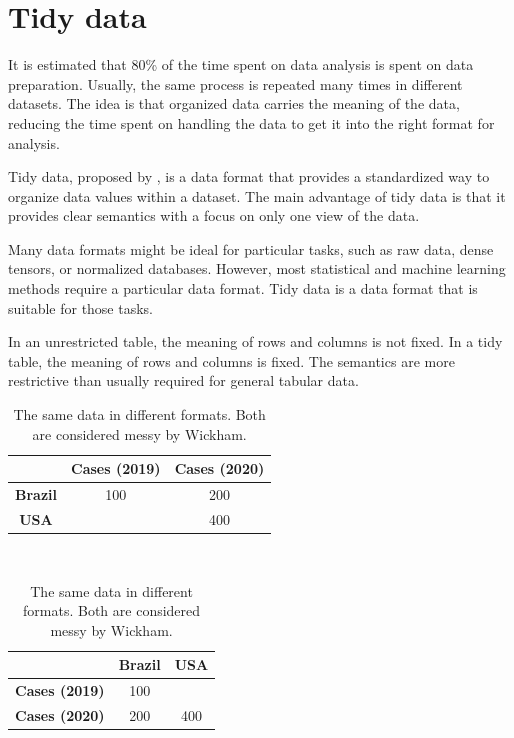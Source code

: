 \section{Tidy data}

It is estimated that 80\% of the time spent on data analysis is spent on data preparation.
Usually, the same process is repeated many times in different datasets. The idea is that
organized data carries the meaning of the data, reducing the time spent on handling
the data to get it into the right format for analysis.

Tidy data, proposed by \textcite{Wickham2014},
is a data format that provides a standardized way to organize data values within
a dataset.  The main advantage of tidy data is that it provides clear semantics with a focus
on only one view of the data.

Many data formats might be ideal for particular tasks, such as raw data, dense tensors, or
normalized databases.  However, most statistical and machine learning methods
require a particular data format.  Tidy data is a data format that is suitable for those
tasks.


In an unrestricted table, the meaning of rows and columns is not fixed.  In a tidy table,
the meaning of rows and columns is fixed.  The semantics are more restrictive than usually
required for general tabular data.

\begin{table}
  \centering
  \begin{tabular}{ccc}
    \toprule
     & \textbf{Cases (2019)} & \textbf{Cases (2020)} \\
    \midrule
    \textbf{Brazil} & 100 & 200 \\
    \textbf{USA} & & 400 \\
    \bottomrule
  \end{tabular}
  \\[1em]
  \begin{tabular}{ccc}
    \toprule
    & \textbf{Brazil} & \textbf{USA} \\
    \midrule
    \textbf{Cases (2019)} & 100 & \\
    \textbf{Cases (2020)} & 200 & 400 \\
    \bottomrule
  \end{tabular}
  \caption{
  The same data in different formats.  Both are considered messy by Wickham.
  }
  \label{tab:simple-messy}
\end{table}

